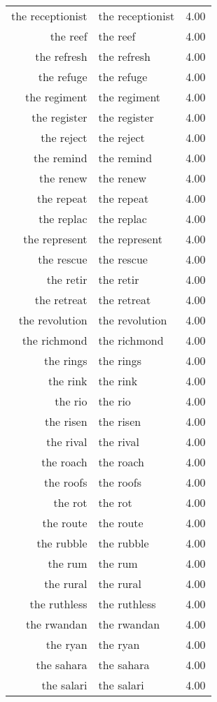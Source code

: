 \begin{table}[ht]
\begin{tabular}{rlr}
  the receptionist & the receptionist & 4.00 \\ 
  the reef & the reef & 4.00 \\ 
  the refresh & the refresh & 4.00 \\ 
  the refuge & the refuge & 4.00 \\ 
  the regiment & the regiment & 4.00 \\ 
  the register & the register & 4.00 \\ 
  the reject & the reject & 4.00 \\ 
  the remind & the remind & 4.00 \\ 
  the renew & the renew & 4.00 \\ 
  the repeat & the repeat & 4.00 \\ 
  the replac & the replac & 4.00 \\ 
  the represent & the represent & 4.00 \\ 
  the rescue & the rescue & 4.00 \\ 
  the retir & the retir & 4.00 \\ 
  the retreat & the retreat & 4.00 \\ 
  the revolution & the revolution & 4.00 \\ 
  the richmond & the richmond & 4.00 \\ 
  the rings & the rings & 4.00 \\ 
  the rink & the rink & 4.00 \\ 
  the rio & the rio & 4.00 \\ 
  the risen & the risen & 4.00 \\ 
  the rival & the rival & 4.00 \\ 
  the roach & the roach & 4.00 \\ 
  the roofs & the roofs & 4.00 \\ 
  the rot & the rot & 4.00 \\ 
  the route & the route & 4.00 \\ 
  the rubble & the rubble & 4.00 \\ 
  the rum & the rum & 4.00 \\ 
  the rural & the rural & 4.00 \\ 
  the ruthless & the ruthless & 4.00 \\ 
  the rwandan & the rwandan & 4.00 \\ 
  the ryan & the ryan & 4.00 \\ 
  the sahara & the sahara & 4.00 \\ 
  the salari & the salari & 4.00 \\ 

\end{tabular}
\end{table}

